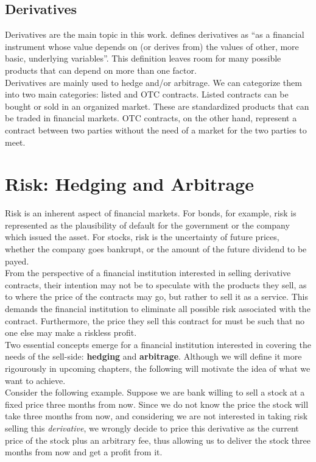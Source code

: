 \documentclass[../TGMAFFIRO]{subfiles}
\begin{document}
\subsection{Derivatives} \label{subs:derivatives}
Derivatives are the main topic in this work.  defines derivatives as ``as a financial instrument whose value depends on (or derives from) the values of other, more basic, underlying variables''. This definition leaves room for many possible products that can depend on more than one factor.\\

Derivatives are mainly used to hedge and/or arbitrage. We can categorize them into two main categories: listed and OTC contracts. Listed contracts can be bought or sold in an organized market. These are standardized products that can be traded in financial markets. OTC contracts, on the other hand, represent a contract between two parties without the need of a market for the two parties to meet.

\section{Risk: Hedging and Arbitrage}\label{sect:risk_hedge_arbitrage}
Risk is an inherent aspect of financial markets. For bonds, for example, risk is represented as the plausibility of default for the government or the company which issued the asset. For stocks, risk is the uncertainty of future prices, whether the company goes bankrupt, or the amount of the future dividend to be payed.\\

From the perspective of a financial institution interested in selling derivative contracts, their intention may not be to speculate with the products they sell, as to where the price of the contracts may go, but rather to sell it as a service. This demands the financial institution to eliminate all possible risk associated with the contract. Furthermore, the price they sell this contract for must be such that no one else may make a riskless profit.\\

Two essential concepts emerge for a financial institution interested in covering the needs of the sell-side: \textbf{hedging} and \textbf{arbitrage}. Although we will define it more rigourously in upcoming chapters, the following will motivate the idea of what we want to achieve.\\

 Consider the following example. Suppose we are bank willing to sell a stock at a fixed price three months from now. Since we do not know the price the stock will take three months from now, and considering we are not interested in taking risk selling this \textit{derivative}, we wrongly decide to price this derivative as the current price of the stock plus an arbitrary fee, thus allowing us to deliver the stock three months from now and get a profit from it.\\
 
\end{document}
